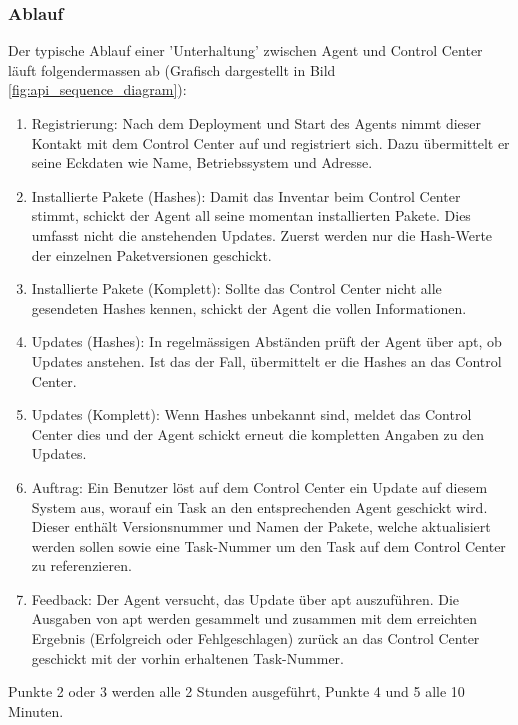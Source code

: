 \subsubsection*{Ablauf}

Der typische Ablauf einer 'Unterhaltung' zwischen Agent und Control Center läuft folgendermassen ab (Grafisch dargestellt in Bild \ref{fig:api_sequence_diagram}):

\begin{enumerate}
    \item Registrierung: Nach dem Deployment und Start des Agents nimmt dieser Kontakt mit dem Control Center auf und registriert sich. Dazu übermittelt er seine Eckdaten wie Name, Betriebssystem und Adresse.
    \item Installierte Pakete (Hashes): Damit das Inventar beim Control Center stimmt, schickt der Agent all seine momentan installierten Pakete. Dies umfasst nicht die anstehenden Updates. Zuerst werden nur die Hash-Werte der einzelnen Paketversionen geschickt.
    \item Installierte Pakete (Komplett): Sollte das Control Center nicht alle gesendeten Hashes kennen, schickt der Agent die vollen Informationen.
    \item Updates (Hashes): In regelmässigen Abständen prüft der Agent über \gls{apt}, ob Updates anstehen. Ist das der Fall, übermittelt er die Hashes an das Control Center.
    \item Updates (Komplett): Wenn Hashes unbekannt sind, meldet das Control Center dies und der Agent schickt erneut die kompletten Angaben zu den Updates.
    \item Auftrag: Ein Benutzer löst auf dem Control Center ein Update auf diesem System aus, worauf ein Task an den entsprechenden Agent geschickt wird. Dieser enthält Versionsnummer und Namen der Pakete, welche aktualisiert werden sollen sowie eine Task-Nummer um den Task auf dem Control Center zu referenzieren.
    \item Feedback: Der Agent versucht, das Update über \gls{apt} auszuführen. Die Ausgaben von apt werden gesammelt und zusammen mit dem erreichten Ergebnis (Erfolgreich oder Fehlgeschlagen) zurück an das Control Center geschickt mit der vorhin erhaltenen Task-Nummer.
\end{enumerate}

Punkte 2 oder 3 werden alle 2 Stunden ausgeführt, Punkte 4 und 5 alle 10 Minuten.